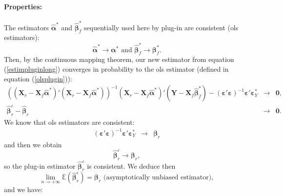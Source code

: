 \documentclass[12pt,a4paper]{report}
\begin{document}
\paragraph{Properties:}The estimators $\hat{\boldsymbol{\alpha}}^*$ and $\hat{\boldsymbol{\beta}}_f^*$ sequentially used here by plug-in are consistent ({\sc ols} estimators):
\begin{equation}
	\hat{\boldsymbol{\alpha}}^*\longrightarrow \boldsymbol{\alpha}^*  \textrm{ and }
	\hat{\boldsymbol{\beta}}_f^*\longrightarrow  \boldsymbol{\beta}_f^*\nonumber .
	\end{equation}
	 Then, by the continuous mapping theorem, our new estimator from equation (\ref{estimpluginlong}) converges in probability to the {\sc ols} estimator (defined in equation (\ref{olsplugin})):
	\begin{eqnarray} 
	\left((\boldsymbol{X}_r-\boldsymbol{X}_f\hat{\boldsymbol{\alpha}}^*)'(\boldsymbol{X}_r-\boldsymbol{X}_f\hat{\boldsymbol{\alpha}}^*)\right)^{-1}(\boldsymbol{X}_r-\boldsymbol{X}_f\hat{\boldsymbol{\alpha}}^*)'(\boldsymbol{Y}- \boldsymbol{X}_f\hat{\boldsymbol{\beta}}^*_f)- (\boldsymbol{\varepsilon}'\boldsymbol{\varepsilon})^{-1}\boldsymbol{\varepsilon}'\boldsymbol{\varepsilon}_Y^*&\longrightarrow & \boldsymbol{0} \nonumber ,\\
	\hat{\boldsymbol{\beta}}^{\varepsilon}_r-\hat{\boldsymbol{\beta}}_r &\longrightarrow &  \boldsymbol{0}. \nonumber
\end{eqnarray}
We know that {\sc ols} estimators are consistent: 
\begin{eqnarray}
(\boldsymbol{\varepsilon}'\boldsymbol{\varepsilon})^{-1}\boldsymbol{\varepsilon}'\boldsymbol{\varepsilon}_Y^*&\longrightarrow & \boldsymbol{\beta}_r  \nonumber
\end{eqnarray}
 and then we obtain
\begin{equation}
	\hat{\boldsymbol{\beta}}_r^{\varepsilon} \longrightarrow \boldsymbol{\beta}_r,  \nonumber 
\end{equation}
so the plug-in estimator $\hat{\boldsymbol{\beta}}_r^{\varepsilon}$ is consistent. We deduce then
\begin{equation}
	\lim_{n\rightarrow + \infty}\mathbb{E}(\hat{\boldsymbol{\beta}}_r^{\varepsilon})=\boldsymbol{\beta}_r \textrm{ (asymptotically unbiased estimator)},\nonumber
\end{equation}
and we have:
\end{document}
